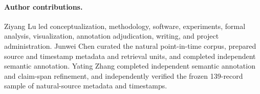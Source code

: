 \documentclass[10pt,twocolumn]{article}
\begin{document}
\paragraph{Author contributions.}
Ziyang Lu led conceptualization, methodology, software, experiments, formal analysis,
visualization, annotation adjudication, writing, and project administration. Junwei
Chen curated the natural point-in-time corpus, prepared source and timestamp metadata
and retrieval units, and completed independent semantic annotation. Yating Zhang
completed independent semantic annotation and claim-span refinement, and independently
verified the frozen 139-record sample of natural-source metadata and timestamps.



\end{document}

